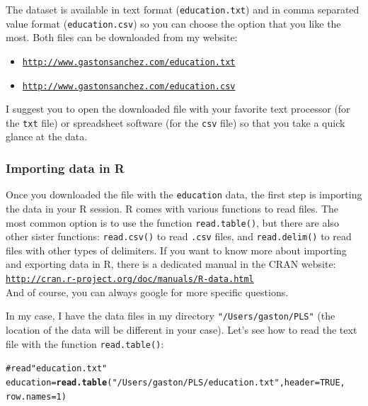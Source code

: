 \documentclass[12pt]{book}\usepackage{graphicx, color}
\makeatletter
\newcommand{\hlfunctioncall}[1]{\textcolor[rgb]{0.501960784313725,0,0.329411764705882}{\textbf{#1}}}%
\newcommand{\hlstring}[1]{\textcolor[rgb]{0.6,0.6,1}{#1}}%
\newcommand{\hlcomment}[1]{\textcolor[rgb]{0.180392156862745,0.6,0.341176470588235}{#1}}%
\newenvironment{kframe}{%
 \def\at@end@of@kframe{}%
 \ifinner\ifhmode%
  \def\at@end@of@kframe{\end{minipage}}%
  \begin{minipage}{\columnwidth}%
 \fi\fi%
 \def\FrameCommand##1{\hskip\@totalleftmargin \hskip-\fboxsep
 \colorbox{shadecolor}{##1}\hskip-\fboxsep
     \hskip-\linewidth \hskip-\@totalleftmargin \hskip\columnwidth}%
 \MakeFramed {\advance\hsize-\width
   \@totalleftmargin\z@ \linewidth\hsize
   \@setminipage}}%
 {\par\unskip\endMakeFramed%
 \at@end@of@kframe}
\newenvironment{knitrout}{}{} %
\newcommand{\code}[1]{\texttt{#1}}
\makeatother
\begin{document}
The dataset is available in text format (\code{education.txt}) and in comma separated value format (\code{education.csv}) so you can choose the option that you like the most. Both files can be downloaded from my website:
\begin{itemize}
 \item[] \texttt{\href{http://www.gastonsanchez.com/education.txt}{http://www.gastonsanchez.com/education.txt}}
 \item[] \texttt{\href{http://www.gastonsanchez.com/education.csv}{http://www.gastonsanchez.com/education.csv}}
\end{itemize}
I suggest you to open the downloaded file with your favorite text processor (for the \code{txt} file) or spreadsheet software (for the \code{csv} file) so that you take a quick glance at the data.

\subsubsection*{Importing data in R}
Once you downloaded the file with the \code{education} data, the first step is importing the data in your R session. R comes with various functions to read files. The most common option is to use the function \code{read.table()}, but there are also other sister functions: \code{read.csv()} to read \code{.csv} files, and \code{read.delim()} to read files with other types of delimiters. If you want to know more about importing and exporting data in R, there is a dedicated manual in the CRAN website: \\
\texttt{\href{http://cran.r-project.org/doc/manuals/R-data.html}{http://cran.r-project.org/doc/manuals/R-data.html}} \\
And of course, you can always google for more specific questions.

In my case, I have the data files in my directory \code{"/Users/gaston/PLS"} (the location of the data will be different in your case). Let's see how to read the text file with the function \code{read.table()}:
\begin{knitrout}
\color{fgcolor}\begin{kframe}
\begin{alltt}
\hlcomment{# read "education.txt"}
education = \hlfunctioncall{read.table}(\hlstring{"/Users/gaston/PLS/education.txt"}, header = TRUE, 
                       row.names = 1)
\end{alltt}
\end{kframe}
\end{knitrout}
\end{document}
